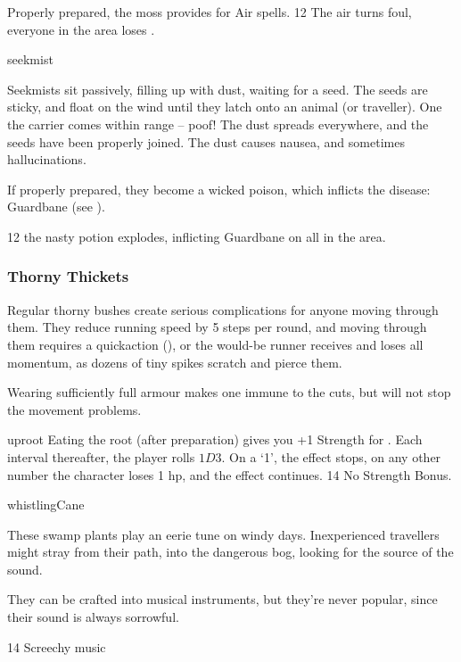 \begin{multicols}{2}
{  Properly prepared, the moss provides  for Air spells.
    }
  {}%
  {12}%
  {The air turns foul, everyone in the \gls{area} loses .}%

%
  {seekmist}%
  {
  Seekmists sit passively, filling up with dust, waiting for a seed.
  The seeds are sticky, and float on the wind until they latch onto an animal (or traveller).
  One the carrier comes within range -- poof!
  The dust spreads everywhere, and the seeds have been properly joined.
  The dust causes nausea, and sometimes hallucinations.

  If properly prepared, they become a wicked poison, which inflicts the disease: Guardbane (see ).
    }
  {}%
  {12}%
  {the nasty potion explodes, inflicting Guardbane on all in the \gls{area}.}%

\subsubsection{Thorny Thickets}
\label{thorny_thickets}

Regular thorny bushes create serious complications for anyone moving through them.
They reduce running speed by 5 \glspl{step} per round, and moving through them requires a  \gls{quickaction} (\tn[10]), or the would-be runner receives  and loses all momentum, as dozens of tiny spikes scratch and pierce them.

Wearing sufficiently full armour makes one immune to the cuts, but will not stop the movement problems.

%
  {uproot}%
  {
  Eating the root (after preparation) gives you +1 Strength for .
  Each \gls{interval} thereafter, the player rolls $1D3$.
  On a `1', the effect stops, on any other number the character loses 1 \gls{hp}, and the effect continues.
    }
{}%
{14}%
{No Strength Bonus.}%

%
  {whistlingCane}%
  {
  These swamp plants play an eerie tune on windy days.
  Inexperienced travellers might stray from their path, into the dangerous bog, looking for the source of the sound.

  They can be crafted into musical instruments, but they're never popular, since their sound is always sorrowful.
  }
{}%
{14}%
{Screechy music}%

\end{multicols}

